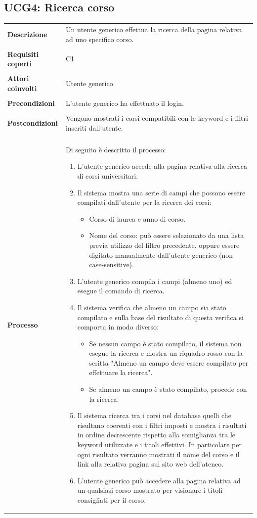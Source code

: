 \documentclass[10pt,a4paper]{report}
\begin{document}
	\subsection{UCG4: Ricerca corso}
	\begin{tabular}{lp{}}
		\textbf{Descrizione}&Un utente generico effettua la ricerca della pagina relativa ad uno specifico corso.\\
		\\
		\textbf{Requisiti coperti}&C1\\
		\\
		\textbf{Attori coinvolti}&Utente generico\\
		\\
		\textbf{Precondizioni}&L'utente generico ha effettuato il login.\\
		\\
		\textbf{Postcondizioni}&Vengono mostrati i corsi compatibili con le keyword e i filtri inseriti dall'utente.\\
		\\
		\textbf{Processo}&Di seguito è descritto il processo:
		\begin{enumerate}
			\item L'utente generico accede alla pagina relativa alla ricerca di corsi universitari.
			\item Il sistema mostra una serie di campi che possono essere compilati dall'utente per la ricerca dei corsi:
			\begin{itemize}
				\item Corso di laurea e anno di corso.
				\item Nome del corso: può essere selezionato da una lista previa utilizzo del filtro precedente, oppure essere digitato manualmente dall'utente generico (non case-sensitive).			
			\end{itemize}
			\item L'utente generico compila i campi (almeno uno) ed esegue il comando di ricerca.
			\item Il sistema verifica che almeno un campo sia stato compilato e sulla base del risultato di questa verifica si comporta in modo diverso:
			\begin{itemize}
				\item Se nessun campo è stato compilato, il sistema non esegue la ricerca e mostra un riquadro rosso con la scritta "Almeno un campo deve essere compilato per effettuare la ricerca".
				\item Se almeno un campo è stato compilato, procede con la ricerca.
			\end{itemize}
			\item Il sistema ricerca tra i corsi nel database quelli che risultano coerenti con i filtri imposti e mostra i risultati in ordine decrescente rispetto alla somiglianza tra le keyword utilizzate e i titoli effettivi. In particolare per ogni risultato verranno mostrati il nome del corso e il link alla relativa pagina sul sito web dell'ateneo.
			\item L'utente generico può accedere alla pagina relativa ad un qualsiasi corso mostrato per visionare i titoli consigliati per il corso.
		\end{enumerate}
	\end{tabular}
\end{document}
